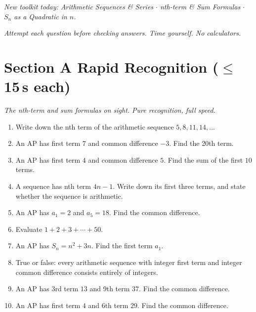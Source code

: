 \documentclass[11pt,a4paper]{article}
\begin{document}
\noindent\textit{New toolkit today: Arithmetic Sequences \& Series $\cdot$ nth-term \& Sum Formulas $\cdot$ $S_n$ as a Quadratic in $n$.}

\vspace{2pt}
\noindent\textit{Attempt each question before checking answers. Time yourself. No calculators.}

\section*{Section A \quad Rapid Recognition \hfill{\normalfont\small($\leq$15\,s each)}}

\noindent\textit{The nth-term and sum formulas on sight. Pure recognition, full speed.}

\begin{enumerate}

\item Write down the nth term of the arithmetic sequence $5, 8, 11, 14, \ldots$

\item An AP has first term $7$ and common difference $-3$. Find the 20th term.

\item An AP has first term $4$ and common difference $5$. Find the sum of the first $10$ terms.

\item A sequence has nth term $4n-1$. Write down its first three terms, and state whether the sequence is arithmetic.

\item An AP has $a_1=2$ and $a_5=18$. Find the common difference.

\item Evaluate $1+2+3+\cdots+50$.

\item An AP has $S_n = n^2+3n$. Find the first term $a_1$.

\item True or false: every arithmetic sequence with integer first term and integer common difference consists entirely of integers.

\item An AP has 3rd term $13$ and 9th term $37$. Find the common difference.

\item An AP has first term $4$ and 6th term $29$. Find the common difference.

\end{enumerate}
\end{document}

